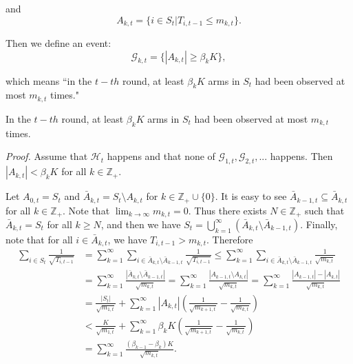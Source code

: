 \documentclass[opre,sglanonrev]{informs4}
\begin{document}
\begin{appendices}
and 
$$ A_{k,t} = \{i \in S_t|T_{i,t-1}\leq m_{k,t}\}.$$

Then we define an event:
$$\mathcal{G}_{k,t}=\{|A_{k,t}|\geq\beta_kK\},$$

which means “in the $t-th$ round, at least $\beta_{k}K$ arms in $S_{t}$ had been observed at most $m_{k,t}$ times."

\begin{lemma}
In the $t-th$ round, at least $\beta_{k}K$ arms in $S_t$ had been observed at most $m_{k,t}$ times.
\end{lemma}

\textit{Proof.} Assume that $\mathcal{H}_t$ happens and that none of $\mathcal{G}_{1,t},\mathcal{G}_{2,t},...$ happens. Then $|A_{k,t}|<\beta_{k}K$ for all $k\in \mathbb{Z}_+$.

Let $A_{0,t} = S_t$ and $\bar{A}_{k,t}=S_t\setminus A_{k,t}$ for $k\in \mathbb{Z}_+\cup \{0\}$. It is easy to see $\bar{A}_{k-1,t}\subseteq\bar{A}_{k,t}$ for all $k\in \mathbb{Z}_+$. Note that $\lim_{k \to \infty}m_{k,t}=0$. Thus there exists $N\in \mathbb{Z}_+$ such that $\bar{A}_{k,t}=S_t$ for all $k\geq N$, and then we have $S_t=\bigcup_{k=1}^\infty\left(\bar{A}_{k,t}\setminus\bar{A}_{k-1,t}\right)$. Finally, note that for all $i\in \bar{A}_{k,t}$, we have $T_{i,t-1}>m_{k,t}$. Therefore
$$\begin{aligned}
\sum_{i\in S_t}\frac{1}{\sqrt{T_{i,t-1}}} & =\sum_{k=1}^\infty\sum_{i\in\bar{A}_{k,t}\setminus\bar{A}_{k-1,t}}\frac{1}{\sqrt{T_{i,t-1}}}\leq\sum_{k=1}^\infty\sum_{i\in\bar{A}_{k,t}\setminus\bar{A}_{k-1,t}}\frac{1}{\sqrt{m_{k,t}}} \\
 & =\sum_{k=1}^\infty\frac{\left|\bar{A}_{k,t}\setminus\bar{A}_{k-1,t}\right|}{\sqrt{m_{k,t}}}=\sum_{k=1}^\infty\frac{\left|A_{k-1,t}\setminus A_{k,t}\right|}{\sqrt{m_{k,t}}}=\sum_{k=1}^\infty\frac{\left|A_{k-1,t}\right|-\left|A_{k,t}\right|}{\sqrt{m_{k,t}}} \\
 & =\frac{|S_t|}{\sqrt{m_{1,t}}}+\sum_{k=1}^\infty|A_{k,t}|\left(\frac{1}{\sqrt{m_{k+1,t}}}-\frac{1}{\sqrt{m_{k,t}}}\right) \\
 & <\frac{K}{\sqrt{m_{1,t}}}+\sum_{k=1}^\infty\beta_kK\left(\frac{1}{\sqrt{m_{k+1,t}}}-\frac{1}{\sqrt{m_{k,t}}}\right) \\
 & =\sum_{k=1}^\infty\frac{(\beta_{k-1}-\beta_k)K}{\sqrt{m_{k,t}}}.
\end{aligned}$$


\end{appendices}
\end{document}

